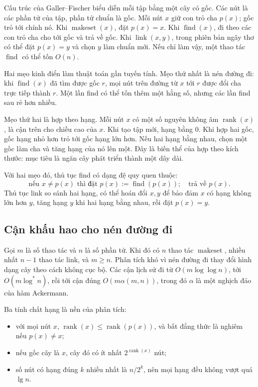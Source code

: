 \documentclass[11pt]{article}
\begin{document}
Cấu trúc của Galler--Fischer biểu diễn mỗi tập bằng một cây có gốc. Các nút là
các phần tử của tập, phần tử chuẩn là gốc. Mỗi nút \(x\) giữ con trỏ cha
\(p(x)\); gốc trỏ tới chính nó. Khi \(\operatorname{makeset}(x)\), đặt
\(p(x)=x\). Khi \(\operatorname{find}(x)\), đi theo các con trỏ cha cho tới gốc
và trả về gốc. Khi \(\operatorname{link}(x,y)\), trong phiên bản ngây thơ có thể
đặt \(p(x)=y\) và chọn \(y\) làm chuẩn mới. Nếu chỉ làm vậy, một thao tác
\(\operatorname{find}\) có thể tốn \(O(n)\).

Hai mẹo kinh điển làm thuật toán gần tuyến tính. Mẹo thứ nhất là nén đường đi:
khi \(\operatorname{find}(x)\) đã tìm được gốc \(r\), mọi nút trên đường từ
\(x\) tới \(r\) được đổi cha trực tiếp thành \(r\). Một lần find có thể tốn thêm
một hằng số, nhưng các lần find sau rẻ hơn nhiều.

Mẹo thứ hai là hợp theo hạng. Mỗi nút \(x\) có một số nguyên không âm
\(\operatorname{rank}(x)\), là cận trên cho chiều cao của \(x\). Khi tạo tập mới,
hạng bằng \(0\). Khi hợp hai gốc, gốc hạng nhỏ hơn trỏ tới gốc hạng lớn hơn.
Nếu hai hạng bằng nhau, chọn một gốc làm cha và tăng hạng của nó lên một. Đây
là biến thể của hợp theo kích thước: mục tiêu là ngăn cây phát triển thành một
dây dài.

Với hai mẹo đó, thủ tục find có dạng đệ quy quen thuộc:
\[
  \text{nếu } x\ne p(x) \text{ thì đặt } p(x):=\operatorname{find}(p(x));
  \quad \text{trả về } p(x).
\]
Thủ tục link so sánh hai hạng, có thể hoán đổi \(x,y\) để bảo đảm \(x\) có hạng
không lớn hơn \(y\), tăng hạng \(y\) khi hai hạng bằng nhau, rồi đặt \(p(x)=y\).

\subsection*{Cận khấu hao cho nén đường đi}

Gọi \(m\) là số thao tác và \(n\) là số phần tử. Khi đó có \(n\) thao tác
\(\operatorname{makeset}\), nhiều nhất \(n-1\) thao tác link, và \(m\ge n\).
Phân tích khó vì nén đường đi thay đổi hình dạng cây theo cách không cục bộ.
Các cận lịch sử đi từ \(O(m\log\log n)\), tới \(O(m\log^* n)\), rồi tới cận
đúng \(O(m\alpha(m,n))\), trong đó \(\alpha\) là một nghịch đảo của hàm
Ackermann.

Ba tính chất hạng là nền của phân tích:
\begin{itemize}
  \item với mọi nút \(x\), \(\operatorname{rank}(x)\le
        \operatorname{rank}(p(x))\), và bất đẳng thức là nghiêm nếu
        \(p(x)\ne x\);
  \item nếu gốc cây là \(x\), cây đó có ít nhất
        \(2^{\operatorname{rank}(x)}\) nút;
  \item số nút có hạng đúng \(k\) nhiều nhất là \(n/2^k\), nên mọi hạng đều
        không vượt quá \(\lg n\).
\end{itemize}
\end{document}
